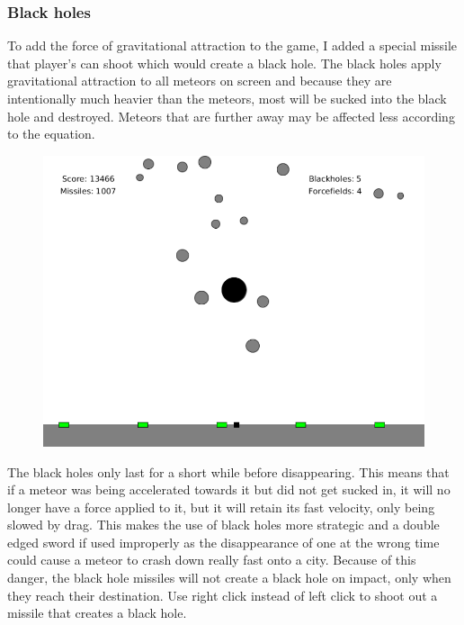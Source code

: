 \documentclass{article}
\begin{document}
\subsubsection*{Black holes}
To add the force of gravitational attraction to the game, I added a special missile that player's can shoot which would create a black hole. The black holes apply gravitational attraction to all meteors on screen and because they are intentionally much heavier than the meteors, most will be sucked into the black hole and destroyed. Meteors that are further away may be affected less according to the equation.
\begin{figure}[H]
\centering
\includegraphics[width=1\textwidth]{imgs/Blackhole.png}
\end{figure}
\noindent
The black holes only last for a short while before disappearing. This means that if a meteor was being accelerated towards it but did not get sucked in, it will no longer have a force applied to it, but it will retain its fast velocity, only being slowed by drag. This makes the use of black holes more strategic and a double edged sword if used improperly as the disappearance of one at the wrong time could cause a meteor to crash down really fast onto a city. Because of this danger, the black hole missiles will not create a black hole on impact, only when they reach their destination. Use right click instead of left click to shoot out a missile that creates a black hole.
 
\end{document}
